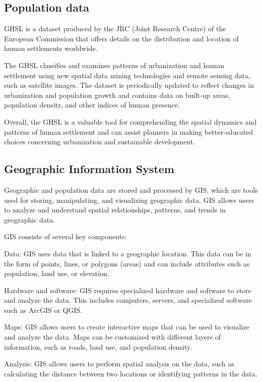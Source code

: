 \documentclass[12pt]{report}
\begin{document}
        \subsection{Population data}
            GHSL \cite{commission_ghsl_2023} is a dataset produced by the JRC (Joint Research Centre) of the European
            Commission that offers details on the distribution and location of human settlements worldwide.

            The GHSL classifies and examines patterns of urbanization and human settlement using new spatial data mining
            technologies and remote sensing data, such as satellite images. The dataset is periodically updated to
            reflect changes in urbanization and population growth and contains data on built-up areas, population
            density, and other indices of human presence.

            Overall, the GHSL is a valuable tool for comprehending the spatial dynamics and patterns of human settlement
            and can assist planners in making better-educated choices concerning urbanization and sustainable
            development.

            \subsection{Geographic Information System}
            Geographic and population data are stored and processed by \ac{GIS}, which are tools used for storing,
            manipulating, and visualizing geographic data. GIS allows users to analyze and understand spatial
            relationships, patterns, and trends in geographic data.
                
            GIS consists of several key components:
            \begin{myitemize}
                \item Data: GIS uses data that is linked to a geographic location. This data can be in the form of
                points, lines, or polygons (areas) and can include attributes such as population, land use, or
                elevation.
                \item Hardware and software: GIS requires specialized hardware and software to store and analyze the
                data. This includes computers, servers, and specialized software such as ArcGIS or QGIS.
                \item Maps: GIS allows users to create interactive maps that can be used to visualize and analyze the
                data. Maps can be customized with different layers of information, such as roads, land use, and
                population density.
                \item Analysis: GIS allows users to perform spatial analysis on the data, such as calculating the
                distance between two locations or identifying patterns in the data.
            \end{myitemize}
            
\end{document}
